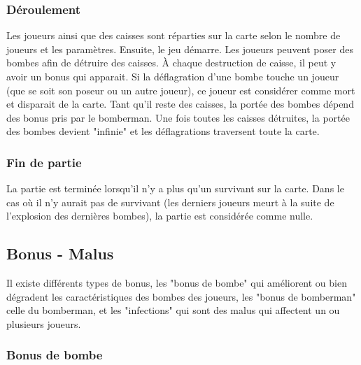 \subsubsection{Déroulement}

Les joueurs ainsi que des caisses sont réparties sur la carte selon le nombre de joueurs et les paramètres. Ensuite, le jeu démarre. Les joueurs peuvent poser des bombes afin de détruire des caisses. À chaque destruction de caisse, il peut y avoir un bonus qui apparait. Si la déflagration d'une bombe touche un joueur (que se soit son poseur ou un autre joueur), ce joueur est considérer comme mort et disparait de la carte. Tant qu'il reste des caisses, la portée des bombes dépend des bonus pris par le bomberman. Une fois toutes les caisses détruites, la portée des bombes devient "infinie" et les déflagrations traversent toute la carte.

\subsubsection{Fin de partie}

La partie est terminée lorsqu'il n'y a plus qu'un survivant sur la carte. Dans le cas où il n'y aurait pas de survivant (les derniers joueurs meurt à la suite de l'explosion des dernières bombes), la partie est considérée comme nulle.

\subsection{Bonus - Malus}

Il existe différents types de bonus, les "bonus de bombe" qui améliorent ou bien dégradent les caractéristiques des bombes des joueurs, les "bonus de bomberman" celle du bomberman, et les "infections" qui sont des malus qui affectent un ou plusieurs joueurs.

\subsubsection{Bonus de bombe}

